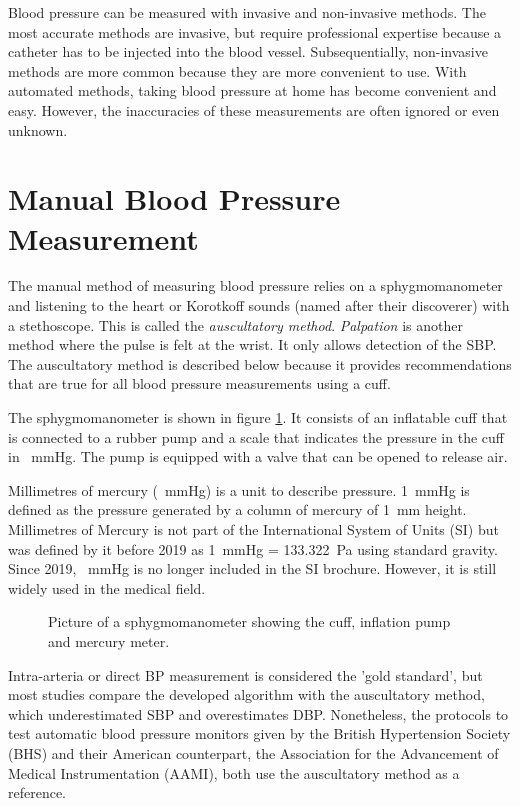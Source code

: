 Blood pressure can be measured with invasive and non-invasive methods. The most accurate methods are invasive, but require professional expertise because a catheter has to be injected into the blood vessel. Subsequentially, non-invasive methods are more common because they are more convenient to use. With automated methods, taking blood pressure at home has become convenient and easy. However, the inaccuracies of these measurements are often ignored or even unknown.

\section{Manual Blood Pressure Measurement}
The manual method of measuring blood pressure relies on a sphygmomanometer and listening to the heart or Korotkoff sounds (named after their discoverer) with a stethoscope. This is called the \emph{auscultatory method}. \emph{Palpation} is another method where the pulse is felt at the wrist. It only allows detection of the SBP. The auscultatory method is described below because it provides recommendations that are true for all blood pressure measurements using a cuff.

The sphygmomanometer is shown in figure \ref{fig:sphy}. It consists of an inflatable cuff that is connected to a rubber pump and a scale that indicates the pressure in the cuff in \SI{}{\mmHg}. The pump is equipped with a valve that can be opened to release air.


Millimetres of mercury (\SI{}{\mmHg}) is a unit to describe pressure. \SI{1}{\mmHg} is defined as the pressure generated by a column of mercury of \SI{1}{\mm} height. Millimetres of Mercury is not part of the International System of Units (SI) but was defined by it before 2019 as \SI{1}{\mmHg} = \SI{133.322}{\Pa} using standard gravity.\cite{SI2006} Since 2019, \SI{}{\mmHg} is no longer included in the SI brochure. However, it is still widely used in the medical field. \cite{Prazak2020}

\begin{figure}[h]
\centering
\caption{Picture of a sphygmomanometer showing the cuff, inflation pump and mercury meter.}
\label{fig:sphy}
\end{figure}

Intra-arteria or direct BP measurement is considered the 'gold standard', but most studies compare the developed algorithm with the auscultatory method, which underestimated SBP and overestimates DBP. \cite{Sapinski1996} Nonetheless, the protocols to test automatic blood pressure monitors given by the British Hypertension Society (BHS) and their American counterpart, the Association for the Advancement of Medical Instrumentation (AAMI), both use the auscultatory method as a reference. \cite{Jazbinsek2010,OBrien1993,AAMI2013}

